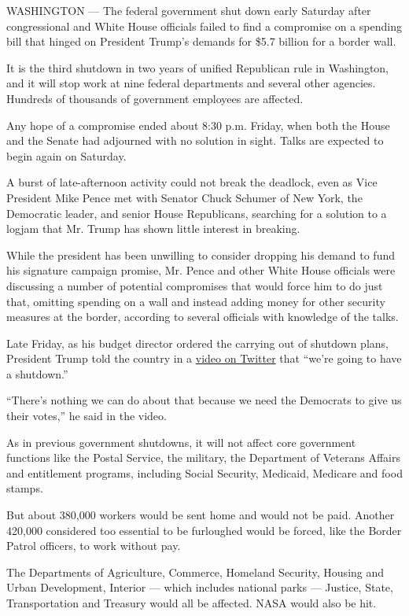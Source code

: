 WASHINGTON --- The federal government shut down early Saturday after
congressional and White House officials failed to find a compromise on a
spending bill that hinged on President Trump's demands for \$5.7 billion
for a border wall.

It is the third shutdown in two years of unified Republican rule in
Washington, and it will stop work at nine federal departments and
several other agencies. Hundreds of thousands of government employees
are affected.

Any hope of a compromise ended about 8:30 p.m. Friday, when both the
House and the Senate had adjourned with no solution in sight. Talks are
expected to begin again on Saturday.

A burst of late-afternoon activity could not break the deadlock, even as
Vice President Mike Pence met with Senator Chuck Schumer of New York,
the Democratic leader, and senior House Republicans, searching for a
solution to a logjam that Mr. Trump has shown little interest in
breaking.

While the president has been unwilling to consider dropping his demand
to fund his signature campaign promise, Mr. Pence and other White House
officials were discussing a number of potential compromises that would
force him to do just that, omitting spending on a wall and instead
adding money for other security measures at the border, according to
several officials with knowledge of the talks.

Late Friday, as his budget director ordered the carrying out of shutdown
plans, President Trump told the country in a
\href{https://twitter.com/realDonaldTrump/status/1076308614372048897}{video
on Twitter} that ``we're going to have a shutdown.''

``There's nothing we can do about that because we need the Democrats to
give us their votes,'' he said in the video.

As in previous government shutdowns, it will not affect core government
functions like the Postal Service, the military, the Department of
Veterans Affairs and entitlement programs, including Social Security,
Medicaid, Medicare and food stamps.

But about 380,000 workers would be sent home and would not be paid.
Another 420,000 considered too essential to be furloughed would be
forced, like the Border Patrol officers, to work without pay.

The Departments of Agriculture, Commerce, Homeland Security, Housing and
Urban Development, Interior --- which includes national parks ---
Justice, State, Transportation and Treasury would all be affected. NASA
would also be hit.

